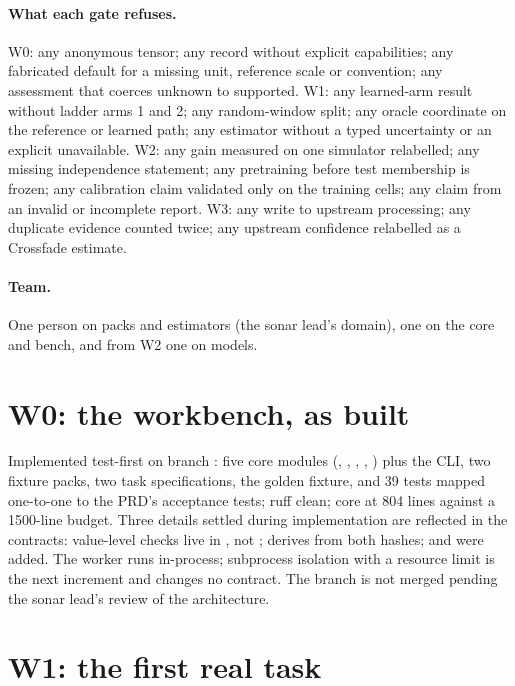 \documentclass[11pt,a4paper]{article}
\begin{document}
\paragraph{What each gate refuses.} W0: any anonymous tensor; any record without explicit capabilities; any fabricated default for a missing unit, reference scale or convention; any assessment that coerces unknown to supported. W1: any learned-arm result without ladder arms 1 and 2; any random-window split; any oracle coordinate on the reference or learned path; any estimator without a typed uncertainty or an explicit unavailable. W2: any gain measured on one simulator relabelled; any missing independence statement; any pretraining before test membership is frozen; any calibration claim validated only on the training cells; any claim from an invalid or incomplete report. W3: any write to upstream processing; any duplicate evidence counted twice; any upstream confidence relabelled as a Crossfade estimate.

\paragraph{Team.} One person on packs and estimators (the sonar lead's domain), one on the core and bench, and from W2 one on models.

\section{W0: the workbench, as built}

Implemented test-first on branch : five core modules (, , , , ) plus the CLI, two fixture packs, two task specifications, the golden fixture, and 39 tests mapped one-to-one to the PRD's acceptance tests; ruff clean; core at 804 lines against a 1500-line budget. Three details settled during implementation are reflected in the contracts: value-level checks live in , not ;  derives from both hashes;  and  were added. The worker runs in-process; subprocess isolation with a resource limit is the next increment and changes no contract. The branch is not merged pending the sonar lead's review of the architecture.

\section{W1: the first real task}
\end{document}
